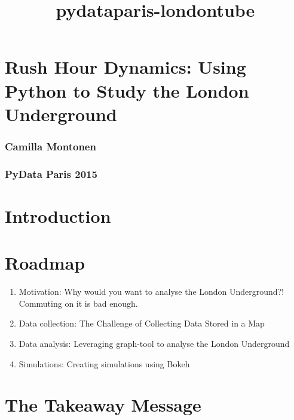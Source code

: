 \documentclass{article}
\title{pydataparis-londontube}
\begin{document}
    
    
    \maketitle
    
    

    
    \section{Rush Hour Dynamics: Using Python to Study the London
Underground}\label{rush-hour-dynamics-using-python-to-study-the-london-underground}

\subsubsection{Camilla Montonen}\label{camilla-montonen}

\subsubsection{PyData Paris 2015}\label{pydata-paris-2015}

    \section{Introduction}\label{introduction}

    \section{Roadmap}\label{roadmap}

\begin{enumerate}
\def\labelenumi{\arabic{enumi}.}
\itemsep1pt\parskip0pt
\item
  Motivation: Why would you want to analyse the London Underground?!
  Commuting on it is bad enough.
\item
  Data collection: The Challenge of Collecting Data Stored in a Map
\item
  Data analysis: Leveraging graph-tool to analyse the London Underground
\item
  Simulations: Creating simulations using Bokeh
\end{enumerate}

    \section{The Takeaway Message}\label{the-takeaway-message}
\end{document}
